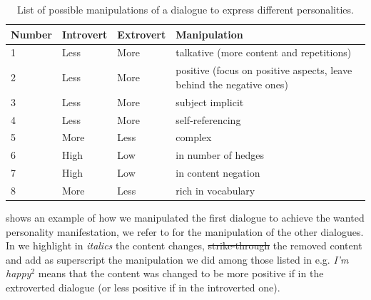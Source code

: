 \documentclass[nomenclature, english, biblatex]{kththesis}
\begin{document}
\begin{table}
    \centering
    \begin{adjustbox}{max width=\textwidth}
        \begin{tabular}{|p{}|p{}|p{}|p{}|}
        \hline
        Number & Introvert & Extrovert & Manipulation \\
        \hline
        \hline
        1 & Less & More & talkative (more content and repetitions)~\cite{pennebaker1999linguistic, furnham1990language}\\
        \hline
        2 & Less & More & positive (focus on positive aspects, leave behind the negative ones)~\cite{pennebaker1999linguistic, thorne1987press}\\
        \hline
        3 & Less & More & subject implicit~\cite{heylighen2002variation}\\
        \hline
        4 & Less & More & self-referencing~\cite{pennebaker1999linguistic}\\
        \hline
        5 & More & Less & complex~\cite{furnham1990language}\\
        \hline
        6 & High & Low & in number of hedges%
        ~\cite{pennebaker1999linguistic}\\
        \hline
        7 & High & Low & in content negation~\cite{pennebaker1999linguistic}\\
        \hline
        8 & More & Less & rich in vocabulary~\cite{dewaele1999extraversion}\\
        \hline
        \end{tabular}
    \end{adjustbox}
    \caption{List of possible manipulations of a dialogue to express different personalities.}
    \label{tab:hand_crafted_manipulations}
\end{table}
 shows an example of how we manipulated the first dialogue to achieve the wanted personality manifestation, we refer to  for the manipulation of the other dialogues. In  we highlight in \textit{italics} the content changes, \sout{strike-through} the removed content and add as superscript the manipulation we did among those listed in  e.g. \textit{I'm happy}$^2$ means that the content was changed to be more positive if in the extroverted dialogue (or less positive if in the introverted one).
\end{document}
